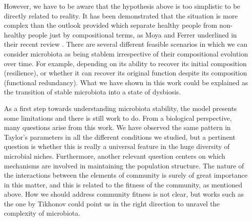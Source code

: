 However, we have to be aware that the hypothesis above is too simplistic to be directly related to reality. It has been demonstrated that the situation is more complex than the outlook provided which separate healthy people from non-healthy people just by compositional terms, as Moya and Ferrer underlined in their recent review \cite{Moya_trends}. There are several different feasible scenarios in which we can consider microbiota as being stablem irrespective of their compositional evolution over time. For example, depending on its ability to recover its initial composition (resilience), or whether it can recover its original function despite its composition (functional redundancy). What we have shown in this work could be explained as the transition of stable microbiota into a state of dysbiosis.  

As a first step towards understanding microbiota stability, the model presents some limitations and there is still work to do. From a biological perspective, many questions arise from this work. We have observed the same pattern in Taylor's parameters in all the different conditions we studied, but a pertinent question is whether this is really a universal feature in the huge diversity of microbial niches. Furthermore, another relevant question centers on which mechanisms are involved in maintaining the population structure. The nature of the interactions between the elements of community is surely of great importance in this matter, and this is related to the fitness of the community, as mentioned above. How we should address community fitness is not clear, but works such as the one by Tikhonov \cite{tikhonov} could point us in the right direction to unravel the complexity of microbiota.
